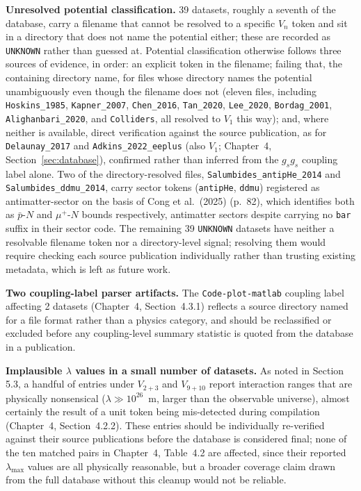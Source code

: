 \documentclass[main]{subfiles}
\begin{document}
\textbf{Unresolved potential classification.} 39 datasets, roughly a
seventh of the database, carry a filename that cannot be resolved to a
specific $V_n$ token and sit in a directory that does not name the
potential either; these are recorded as \texttt{UNKNOWN} rather than
guessed at. Potential classification otherwise follows three sources of
evidence, in order: an explicit token in the filename; failing that, the
containing directory name, for files whose directory names the potential
unambiguously even though the filename does not (eleven files, including
\texttt{Hoskins\_1985}, \texttt{Kapner\_2007}, \texttt{Chen\_2016},
\texttt{Tan\_2020}, \texttt{Lee\_2020}, \texttt{Bordag\_2001},
\texttt{Alighanbari\_2020}, and \texttt{Colliders}, all resolved to $V_1$
this way); and, where neither is available, direct verification against
the source publication, as for \texttt{Delaunay\_2017} and
\texttt{Adkins\_2022\_eeplus} (also $V_1$; Chapter~4,
Section~\ref{sec:database}), confirmed rather than inferred from the
$g_sg_s$ coupling label alone. Two of the directory-resolved files,
\texttt{Salumbides\_antipHe\_2014} and \texttt{Salumbides\_ddmu\_2014},
carry sector tokens (\texttt{antipHe}, \texttt{ddmu}) registered as
antimatter-sector on the basis of Cong et al.\ (2025)
\cite{Cong2025} (p.~82), which identifies both as $\bar p$-$N$ and
$\mu^+$-$N$ bounds respectively, antimatter sectors despite carrying no
\texttt{bar} suffix in their sector code. The remaining 39 \texttt{UNKNOWN}
datasets have neither a resolvable filename token nor a directory-level
signal; resolving them would require checking each source publication
individually rather than trusting existing metadata, which is left as
future work.

\textbf{Two coupling-label parser artifacts.} The \texttt{Code-plot-matlab}
coupling label affecting 2 datasets (Chapter~4, Section~4.3.1) reflects a
source directory named for a file format rather than a physics category,
and should be reclassified or excluded before any coupling-level summary
statistic is quoted from the database in a publication.

\textbf{Implausible $\lambda$ values in a small number of datasets.} As
noted in Section 5.3, a handful of entries under $V_{2+3}$ and $V_{9+10}$
report interaction ranges that are physically nonsensical
($\lambda\gg10^{26}$~m, larger than the observable universe), almost
certainly the result of a unit token being mis-detected during compilation
(Chapter~4, Section~4.2.2). These entries should be individually
re-verified against their source publications before the database is
considered final; none of the ten matched pairs in Chapter~4, Table~4.2
are affected, since their reported $\lambda_{\max}$ values are all
physically reasonable, but a broader coverage claim drawn from the full
database without this cleanup would not be reliable.
\end{document}
